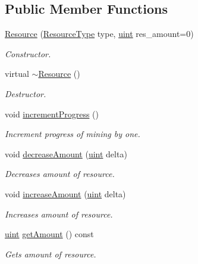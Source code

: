 \subsection*{Public Member Functions}
\begin{DoxyCompactItemize}
\item 
\hyperlink{classResource_a5740e20b90ce4cc9dd8cdb96947bd298}{Resource} (\hyperlink{BasicTypes_8h_a8571efa4409be32e28abf3ea74a0dbb1}{Resource\-Type} type, \hyperlink{BasicTypes_8h_a91ad9478d81a7aaf2593e8d9c3d06a14}{uint} res\-\_\-amount=0)
\begin{DoxyCompactList}\small\item\em Constructor. \end{DoxyCompactList}\item 
virtual \hyperlink{classResource_a0e5ec475e2601bdb33644468e86f6f10}{$\sim$\-Resource} ()
\begin{DoxyCompactList}\small\item\em Destructor. \end{DoxyCompactList}\item 
void \hyperlink{classResource_a6eb73f19cd1f3cf7485dc659256fe239}{increment\-Progress} ()
\begin{DoxyCompactList}\small\item\em Increment progress of mining by one. \end{DoxyCompactList}\item 
void \hyperlink{classResource_acb41587e4354c39a81c4f7d2674f4f88}{decrease\-Amount} (\hyperlink{BasicTypes_8h_a91ad9478d81a7aaf2593e8d9c3d06a14}{uint} delta)
\begin{DoxyCompactList}\small\item\em Decreases amount of resource. \end{DoxyCompactList}\item 
void \hyperlink{classResource_a55b2623e12687bedc2efced0bc781fc6}{increase\-Amount} (\hyperlink{BasicTypes_8h_a91ad9478d81a7aaf2593e8d9c3d06a14}{uint} delta)
\begin{DoxyCompactList}\small\item\em Increases amount of resource. \end{DoxyCompactList}\item 
\hyperlink{BasicTypes_8h_a91ad9478d81a7aaf2593e8d9c3d06a14}{uint} \hyperlink{classResource_a0a83fccc63c105f0f3dd706daebb1270}{get\-Amount} () const 
\begin{DoxyCompactList}\small\item\em Gets amount of resource. \end{DoxyCompactList}\item 

\end{DoxyCompactItemize}
